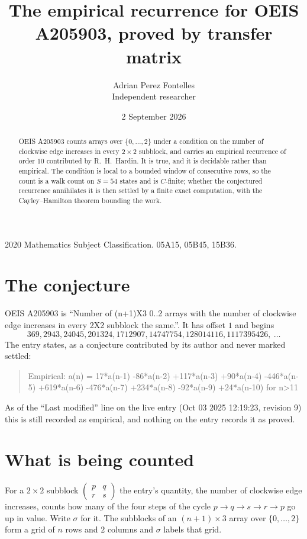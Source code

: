\documentclass[11pt,a4paper]{article}
\title{The empirical recurrence for OEIS A205903, proved by transfer matrix}
\author{Adrian Perez Fontelles\\ \small Independent researcher}
\date{2 September 2026}
\theoremstyle{plain}
\theoremstyle{definition}
\begin{document}
\maketitle

\begin{abstract}
OEIS A205903 counts arrays over $\{0,\dots,2\}$ under a condition on the number of clockwise edge increases
in every $2\times2$ subblock, and carries an empirical recurrence of order $10$ contributed by
R.~H.~Hardin. It is true, and it is decidable rather than empirical. The condition is local to
a bounded window of consecutive rows, so the count is a walk count on $S=54$ states and is
$C$-finite; whether the conjectured recurrence annihilates it is then settled by a finite exact
computation, with the Cayley--Hamilton theorem bounding the work.
\end{abstract}

\noindent\small 2020 Mathematics Subject Classification. 05A15, 05B45, 15B36.\normalsize

\section{The conjecture}

OEIS A205903 is ``Number of (n+1)X3 0..2 arrays with the number of clockwise edge increases in every 2X2 subblock the same.''. It has offset $1$ and begins
\[
369, 2943, 24045, 201324, 1712907, 14747754, 128014116, 1117395426,\ \dots
\]
The entry states, as a conjecture contributed by its author and never marked settled:
\begin{quote}
Empirical: a(n) = 17*a(n-1) -86*a(n-2) +117*a(n-3) +90*a(n-4) -446*a(n-5) +619*a(n-6) -476*a(n-7) +234*a(n-8) -92*a(n-9) +24*a(n-10) for n>11
\end{quote}
As of the ``Last modified'' line on the live entry (Oct 03 2025 12:19:23, revision 9) this is still
recorded as empirical, and nothing on the entry records it as proved.

\section{What is being counted}

For a $2\times2$ subblock $\begin{pmatrix}p&q\\r&s\end{pmatrix}$ the
entry's quantity, the number of clockwise edge increases, counts how many of the four steps of the cycle $p\to q\to s\to r\to p$ go up in value. Write $\sigma$ for it. The subblocks of an
$(n+1)\times3$ array over $\{0,\dots,2\}$ form a grid of $n$ rows and $2$
columns and $\sigma$ labels that grid.
\end{document}
